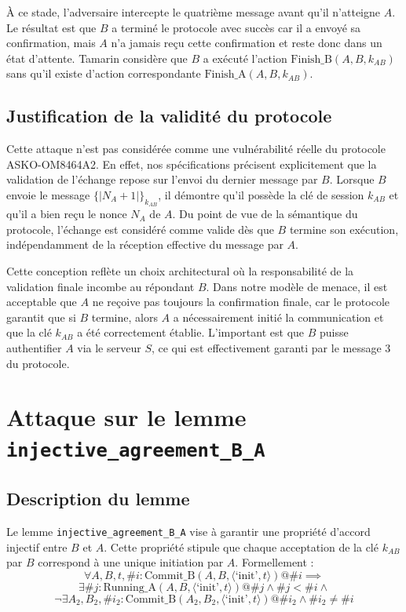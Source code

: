 \documentclass[11pt]{article}
\begin{document}
À ce stade, l'adversaire intercepte le quatrième message avant qu'il n'atteigne $A$. Le résultat 
est que $B$ a terminé le protocole avec succès car il a envoyé sa confirmation, mais $A$ n'a 
jamais reçu cette confirmation et reste donc dans un état d'attente. Tamarin considère que $B$ 
a exécuté l'action $\text{Finish\_B}(A, B, k_{AB})$ sans qu'il existe d'action correspondante 
$\text{Finish\_A}(A, B, k_{AB})$.

\subsection{Justification de la validité du protocole}

Cette attaque n'est pas considérée comme une vulnérabilité réelle du protocole ASKO-OM8464A2. 
En effet, nos spécifications précisent explicitement que la validation de l'échange repose sur 
l'envoi du dernier message par $B$. Lorsque $B$ envoie le message $\{|N_A + 1|\}_{k_{AB}}$, il 
démontre qu'il possède la clé de session $k_{AB}$ et qu'il a bien reçu le nonce $N_A$ de $A$. 
Du point de vue de la sémantique du protocole, l'échange est considéré comme valide dès que $B$ 
termine son exécution, indépendamment de la réception effective du message par $A$.

Cette conception reflète un choix architectural où la responsabilité de la validation finale 
incombe au répondant $B$. Dans notre modèle de menace, il est acceptable que $A$ ne reçoive pas 
toujours la confirmation finale, car le protocole garantit que si $B$ termine, alors $A$ a 
nécessairement initié la communication et que la clé $k_{AB}$ a été correctement établie. 
L'important est que $B$ puisse authentifier $A$ via le serveur $S$, ce qui est effectivement 
garanti par le message 3 du protocole.

\section{Attaque sur le lemme \texttt{injective\_agreement\_B\_A}}

\subsection{Description du lemme}

Le lemme \texttt{injective\_agreement\_B\_A} vise à garantir une propriété d'accord injectif 
entre $B$ et $A$. Cette propriété stipule que chaque acceptation de la clé $k_{AB}$ par $B$ 
correspond à une unique initiation par $A$. Formellement :
\[
\forall A, B, t, \#i : \text{Commit\_B}(A, B, \langle \text{`init'}, t \rangle) @ \#i \implies 
\]
\[
\exists \#j : \text{Running\_A}(A, B, \langle \text{`init'}, t \rangle) @ \#j \land \#j < \#i \land
\]
\[
\neg \exists A_2, B_2, \#i_2 : \text{Commit\_B}(A_2, B_2, \langle \text{`init'}, t \rangle) @ \#i_2 \land \#i_2 \neq \#i
\]
\end{document}
